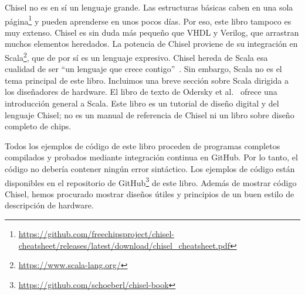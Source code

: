 \documentclass[%
    10pt,
    headinclude, footinclude=false,
    openright, %
    notitlepage,
    cleardoublepage=empty,
    headsepline,
    numbers=noenddot,
    bibliography=totoc, index=totoc,
    ]{scrbook}
\newcommand{\myref}[2]{\href{#1}{#2}}
\renewcommand{\myref}[2]{{#2}{\footnote{\url{#1}}}}
\begin{document}

Chisel no es en sí un lenguaje grande. Las estructuras básicas caben en
\myref{https://github.com/freechipsproject/chisel-cheatsheet/releases/latest/download/chisel_cheatsheet.pdf}{una sola página}
y pueden aprenderse en unos pocos días.
Por eso, este libro tampoco es muy extenso.
Chisel es sin duda más pequeño que VHDL y Verilog, que arrastran muchos elementos heredados.
La potencia de Chisel proviene de su integración en
\myref{https://www.scala-lang.org/}{Scala}, que de por sí es un lenguaje expresivo.
Chisel hereda de Scala esa cualidad de ser ``un lenguaje que crece contigo''~\cite{Scala}.
Sin embargo, Scala no es el tema principal de este libro.
Incluimos una breve sección sobre Scala dirigida a los diseñadores de hardware.
El libro de texto de Odersky et al.~\cite{Scala} ofrece una introducción general
a Scala.
Este libro es un tutorial de diseño digital y del lenguaje Chisel; no es
un manual de referencia de Chisel ni un libro sobre diseño completo de chips.


Todos los ejemplos de código de este libro proceden de programas completos
compilados y probados mediante integración continua en GitHub.
Por lo tanto, el código no debería contener
ningún error sintáctico. Los ejemplos de código están disponibles en el
\myref{https://github.com/schoeberl/chisel-book}{repositorio de GitHub}
de este libro.
Además de mostrar código Chisel, hemos procurado mostrar diseños útiles y
principios de un buen estilo de descripción de hardware.
\end{document}
